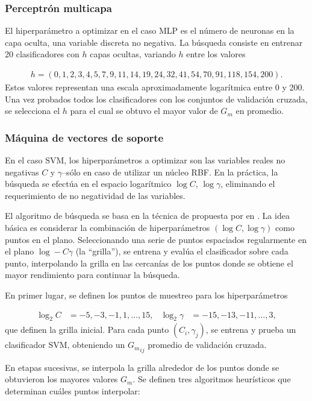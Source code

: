 \subsubsection{Perceptrón multicapa}
El hiperparámetro a optimizar en el caso MLP es el número de neuronas
en la capa oculta, una variable discreta no negativa.  La búsqueda
consiste en entrenar 20 clasificadores con $h$ capas ocultas, variando
$h$ entre los valores

\begin{align}
  \label{mlp-hidden-tries}
  h=(0,1,2,3,4,5,7,9,11,14,19,24,32,41,54,70,91,118,154,200).
\end{align}
Estos valores representan una escala aproximadamente logarítmica entre
0 y 200. Una vez probados todos los clasificadores con los conjuntos
de validación cruzada, se selecciona el $h$ para el cual se obtuvo el
mayor valor de $G_m$ en promedio.

\subsubsection{Máquina de vectores de soporte}
En el caso SVM, los hiperparámetros a optimizar son las variables
reales no negativas $C$ y $\gamma$--sólo en caso de utilizar un núcleo
RBF. En la práctica, la búsqueda se efectúa en el espacio logarítmico
$\log{}C$, $\log\gamma$, eliminando el requerimiento de no negatividad
de las variables.

El algoritmo de búsqueda se basa en la técnica de  propuesta por \citeauthor{hsu} en \cite{hsu}.  La idea
básica es considerar la combinación de hiperparámetros $(\log
C,\log\gamma)$ como puntos en el plano.  Seleccionando una serie de
puntos espaciados regularmente en el plano $\log-C\gamma$ (la
``grilla''), se entrena y evalúa el clasificador sobre cada punto,
interpolando la grilla en las cercanías de los puntos donde se obtiene
el mayor rendimiento para continuar la búsqueda.

En primer lugar, se definen los puntos de muestreo para los
hiperparámetros

\begin{align*}
  \log_2 C &= -5, -3, -1, 1, \ldots, 15, & \log_2\gamma &= -15,-13,
  -11, \ldots,3,
\end{align*}
que definen la grilla inicial. Para cada punto $(C_i,\gamma_j)$, se
entrena y prueba un clasificador SVM, obteniendo un ${G_m}_{ij}$
promedio de validación cruzada.

En etapas sucesivas, se interpola la grilla alrededor de los puntos
donde se obtuvieron los mayores valores $G_m$. Se definen tres algoritmos
heurísticos que determinan cuáles puntos interpolar:

